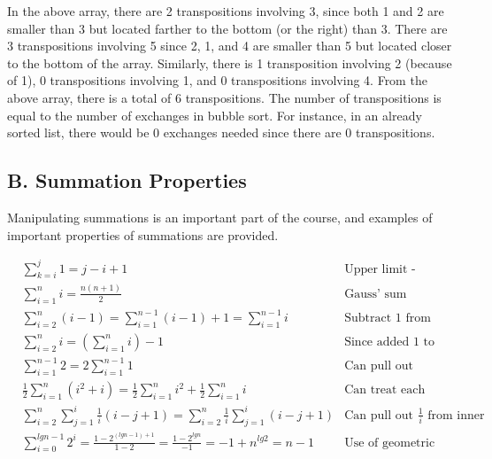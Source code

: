 \documentclass[english, 10pt]{article}
\begin{document}
In the above array, there are 2 transpositions involving 3, since both 1 and 2 are smaller than 3 but located farther to the bottom (or the right) than 3. There are 3 transpositions involving 5 since 2, 1, and 4 are smaller than 5 but located closer to the bottom of the array. Similarly, there is 1 transposition involving 2 (because of 1), 0 transpositions involving 1, and 0 transpositions involving 4. From the above array, there is a total of 6 transpositions. 
\newline
\newline
The number of transpositions is equal to the number of exchanges in bubble sort. For instance, in an already sorted list, there would be 0 exchanges needed since there are 0 transpositions. 

\subsection{B. Summation Properties}

Manipulating summations is an important part of the course, and examples of important properties of summations are provided.

\begin{align*}
    &\sum_{k=i}^{j}1 = j-i+1 & \text{Upper limit - lower limit + 1} \\
    &\sum_{i=1}^{n}i= \frac{n(n+1)}{2} & \text{Gauss' sum formula, notice that lower limit is 1} \\
    &\sum_{i=2}^{n}(i-1) 
    =\sum_{i=1}^{n-1}(i-1)+1 = \sum_{i=1}^{n-1}i & \text{Subtract 1 from both limits and add 1 to formula}\\
    &\sum_{i=2}^{n}i 
    = (\sum_{i=1}^{n}i)-1 & \text{Since added 1 to summation, subtract 1 outside of it}\\
    &\sum_{i=1}^{n-1} 2
    = 2\sum_{i=1}^{n-1}1 & \text{Can pull out coefficients if not related to index (which is i here)}\\
    &\frac{1}{2}\sum_{i=1}^{n}(i^2+i) 
    =\frac{1}{2}\sum_{i=1}^{n}i^2 + \frac{1}{2}\sum_{i=1}^{n}i & \text{Can treat each term in parantheses as separate summation}\\
    &\sum_{i=2}^{n} \sum_{j=1}^{i}\frac{1}{i}(i-j+1) 
    =\sum_{i=2}^{n}\frac{1}{i}\sum_{j=1}^{i}(i-j+1) & \text{Can pull out $\frac{1}{i}$ from inner summation because j is index}\\
    &\sum_{i=0}^{lgn-1}2^i  
    =\frac{1-2^{(lgn-1)+1}}{1-2} = \frac{1-2^{lgn}}{-1} = -1 + n^{lg2} = n-1 & \text{Use of geometric series formula}\\
\end{align*}
\end{document}
